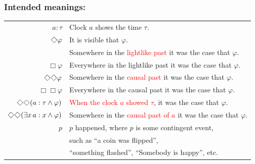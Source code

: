 \documentclass[xcolor=x11names]{beamer}
\newcommand{\cemph}[1]{\textcolor{red}{#1}}
\renewcommand{\Diamond}{\scalebox{.9}{\raisebox{-.4ex}{\rotatebox{45}{$\Box$}}}}
\begin{document}
\begin{frame}[t]
\frametitle{Intended meanings:}
\footnotesize
\def\sortav{.5em}
\begin{tabular}{rl}
   $a:\tau$& Clock $a$ shows the time $\tau$.
\pause
\\[\sortav] $\Diamond \varphi$& It is visible that $\varphi$.
\\[\sortav]                    & Somewhere in the \cemph{lightlike past} it was the case that $\varphi$.
\pause
\\[\sortav] $\Box \varphi$    & Everywhere in the lightlike past it was the case that $\varphi$.
\pause
\\[\sortav] $\Diamond\Diamond \varphi $& Somewhere in the \cemph{causal past} it was the case that $\varphi$.
\pause
\\[\sortav] $\Box\Box \varphi $&  Everywhere in the causal past it was the case that $\varphi$.
\pause
\\[\sortav] $\Diamond\Diamond (a:\tau \land \varphi) $& \cemph{When the clock $a$ showed $\tau $}, it was the case that $\varphi$.
\pause
\\[\sortav] $\Diamond\Diamond (\exists x\, a:x \land \varphi) $& Somewhere in the \cemph{causal past of $a$} it was the case that $\varphi$.
\pause
\\[\sortav] $p$& $p$ happened, where $p$ is some contingent event,
\\& such as ``a coin was flipped'',
\\& ``something flashed'', ``Somebody is happy'', etc.
\end{tabular}

\end{frame}
\end{document}
